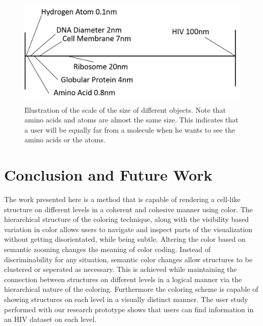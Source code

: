 \documentclass[review,journal]{vgtc}         %
\begin{document}
	\begin{figure}
		\centering
		\includegraphics[width=1\linewidth]{Figures/hivscale}
		\caption{Illustration of the scale of the size of different objects. Note that amino acids and atoms are almost the same size. This indicates that a user will be equally far from a molecule when he wants to see the amino acids or the atoms.}
		\label{fig:hivScale}
	\end{figure}
	
	
	
	\section{Conclusion and Future Work}
	The work presented here is a method that is capable of rendering a cell-like structure on different levels in a coherent and cohesive manner using color. 
	The hierarchical structure of the coloring technique, along with the visibility based variation in color allows users to navigate and inspect parts of the visualization without getting disorientated, while being subtle.
	Altering the color based on semantic zooming changes the meaning of color coding.
	Instead of discriminability for any situation, semantic color changes allow structures to be clustered or seperated as necessary.
	This is achieved while maintaining the connection between structures on different levels in a logical manner via the hierarchical nature of the coloring.
	Furthermore the coloring scheme is capable of showing structures on each level in a visually distinct manner. 
	The user study performed with our research prototype shows that users can find information in an HIV dataset on each level. 
	
	
	
	
	
	
	
\end{document}
